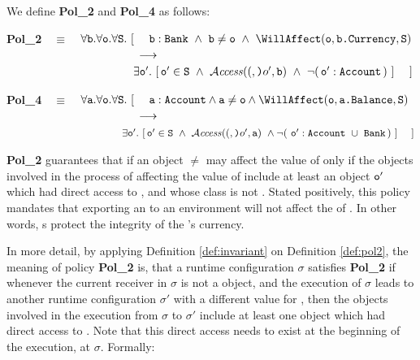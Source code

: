 \documentclass[acmsmall,screen]{acmart}
\begin{document}
\begin{definition}
\label{def:pol2}
We define   {\bf {Pol\_2}}  and   {\bf {Pol\_4}} as follows:

  {\bf {Pol\_2}}\ \  $\equiv$\ \ $\forall \prg{b}.\forall \prg{o}.\forall \prg{S}.\ [ \ \  \ \ \prg{b}:\prg{Bank}\ \wedge\  \prg{b}\neq \prg{o}\ \wedge \ \WillAffect(\prg{o},\prg{b.Currency},\prg{S})  $\\
  $\strut \hspace{4cm}  \longrightarrow$\\
 $\strut \hspace{3.9cm}  \exists \prg{o}'.\ [\, \prg{o}'\in \prg{S}\ \wedge \  \CanAccess( \prg{o}', \prg{b} )\ \wedge\ \neg (\, \prg{o}' : \prg{Account} \, ) \ ] \  \  \ \  ]$
 
 \vspace{.1cm}
    {\bf {Pol\_4}}\ \  $\equiv$\ \ $\forall \prg{a}.\forall \prg{o}.\forall \prg{S}.\ [ \ \  \ \  \prg{a}:\prg{Account} \wedge \prg{a}\neq\prg{o} \wedge \WillAffect(\prg{o},\prg{a.Balance},\prg{S}) $\  \\
  $\strut \hspace{4cm}  \longrightarrow$ \\
 $\strut \hspace{3.9cm} \exists \prg{o}'.\ [\, \prg{o}'\in \prg{S}\ \wedge \ \CanAccess( \prg{o}', \prg{a} )\ \wedge \neg (\  \prg{o}' : \prg{Account}\ \cup\ \prg{Bank}\, ) \ ] \ \ \ \ ]$

\end{definition}


{\bf {Pol\_2}}  guarantees
that if an object $\neq$ may affect the value of  only if the  objects 
involved in the process of affecting the value of   include at least an object ${\mbox{\tt{o}}}'$ 
which had direct access to , and 
whose class is  not  . Stated positively, this policy mandates 
that exporting an  to an environment will not affect the  of .  
In other words,
s protect the integrity of the 's currency.
 
 
In more detail, by applying  Definition \ref{def:invariant} on Definition \ref{def:pol2}, the  meaning of policy {\bf {Pol\_2}}  
  is, that a runtime configuration $\sigma$ satisfies  {\bf {Pol\_2}}  if whenever the current receiver in $\sigma$
 is not a  object, and the execution of $\sigma$ leads to another runtime configuration $\sigma'$ 
 with a different value for , then the objects involved in the execution from
 $\sigma$ to $\sigma'$ include at least one object which had direct access to . 
 Note that this direct access needs to exist at the beginning of   the execution, \ie at $\sigma$.
 Formally:
 
\end{document}
